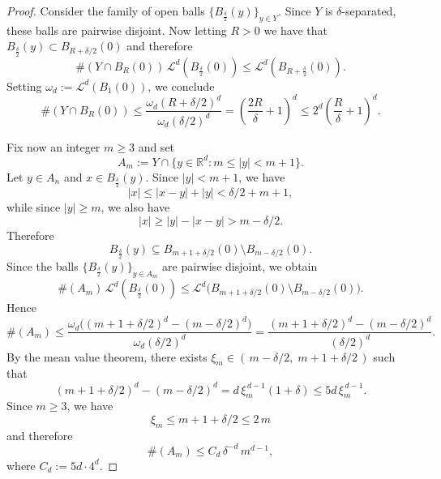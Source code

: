 \documentclass[12pt,a4paper,oneside]{amsart}
\theoremstyle{plain}
\theoremstyle{definition}
\numberwithin{equation}{section}
\numberwithin{figure}{section}
\numberwithin{table}{section}
\theoremstyle{remark}
\newcommand{\R}{\mathbb{R}}
\begin{document}
\begin{proof}
Consider the family of open balls $\{B_{\frac{\delta}{2}}(y)\}_{y\in Y}$. Since $Y$ is $\delta$-separated, these balls are pairwise disjoint. Now letting $R>0$ we have that $B_{\frac{\delta}{2}}(y)\subset B_{R+\delta/2}(0)$ and therefore
\begin{equation*}
\#(Y\cap B_R(0))\,\mathcal L^d(B_{\frac{\delta}{2}}(0))
\le \mathcal L^d(B_{R+\frac{\delta}{2}}(0)).    
\end{equation*}
Setting $\omega_d:=\mathcal L^d(B_1(0))$, we conclude
\begin{equation*}
    \#(Y\cap B_R(0))
\le \frac{\omega_d(R+\delta/2)^d}{\omega_d(\delta/2)^d}
= \left(\frac{2R}{\delta}+1\right)^d\leq 2^d\left(\frac{R}{\delta}+1\right)^d.
\end{equation*}

Fix now an integer $m\ge 3$ and set
\begin{equation*}
    A_m:=Y\cap\{y\in\R^d:m\le |y|<m+1\}.
\end{equation*}
Let $y\in A_n$ and  $x\in B_{\frac{\delta}{2}}(y)$. Since $|y|<m+1$, we have
\begin{equation*}
|x|\le |x-y|+|y|<\delta/2+m+1,    
\end{equation*}
while since $|y|\ge m$, we also have
\begin{equation*}
|x|\ge |y|-|x-y|>m-\delta/2.
\end{equation*}
Therefore
\begin{equation*}
B_{\frac{\delta}{2}}(y)\subseteq B_{m+1+\delta/2}(0)\setminus B_{m-\delta/2}(0).
\end{equation*}
Since the balls $\{B_{\frac{\delta}{2}}(y)\}_{y\in A_m}$ are pairwise disjoint, we obtain
\begin{equation*}
\#(A_m)\,\mathcal L^d(B_{\frac{\delta}{2}}(0))
\le
\mathcal L^d\bigl(B_{m+1+\delta/2}(0)\setminus B_{m-\delta/2}(0)\bigr).
\end{equation*}
Hence
\begin{equation*}
\#(A_m)
\le
\frac{\omega_d\bigl((m+1+\delta/2)^d-(m-\delta/2)^d\bigr)}
{\omega_d(\delta/2)^d}
=
\frac{(m+1+\delta/2)^d-(m-\delta/2)^d}{(\delta/2)^d}.    
\end{equation*}
By the mean value theorem, there exists
$\xi_m\in (\,m-\delta/2,\; m+1+\delta/2\,)$
such that
\begin{equation*}
(m+1+\delta/2)^d-(m-\delta/2)^d
=
d\,\xi_m^{\,d-1}(1+\delta)\leq 5d\,\xi_m^{\,d-1} .    
\end{equation*}
Since $m\ge 3$, we have
\begin{equation*}
\xi_m\le m+1+\delta/2 \le 2\, m
\end{equation*}
and therefore
\begin{equation*}
\#(A_m)\le C_d\,\delta^{-d}\,m^{d-1},
\end{equation*}
where $C_d:=5d \cdot4^d $.
\end{proof}
\end{document}
